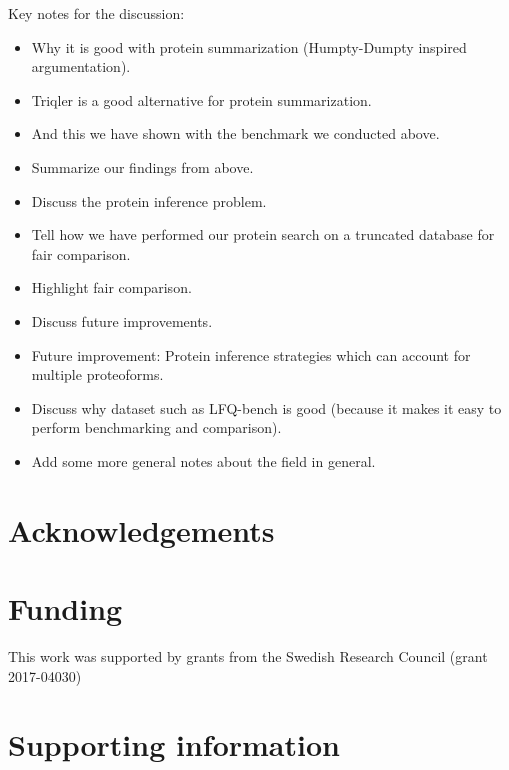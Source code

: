 \documentclass[10pt,letterpaper]{article}
\begin{document}
Key notes for the discussion:
\begin{itemize}
  \item Why it is good with protein summarization (Humpty-Dumpty inspired argumentation).
  \item Triqler is a good alternative for protein summarization.
  \item And this we have shown with the benchmark we conducted above.
  \item Summarize our findings from above.
  \item Discuss the protein inference problem.
  \item Tell how we have performed our protein search on a truncated database for fair comparison.
  \item Highlight fair comparison.
  \item Discuss future improvements.
  \item Future improvement: Protein inference strategies which can account for multiple proteoforms.
  \item Discuss why dataset such as LFQ-bench is good (because it makes it easy to perform benchmarking and comparison).
  \item Add some more general notes about the field in general.
  
\end{itemize}



\section*{Acknowledgements}


\section*{Funding}

This work was supported by grants from the Swedish Research Council (grant 2017-04030) 

\section*{Supporting information}


%

\end{document}
